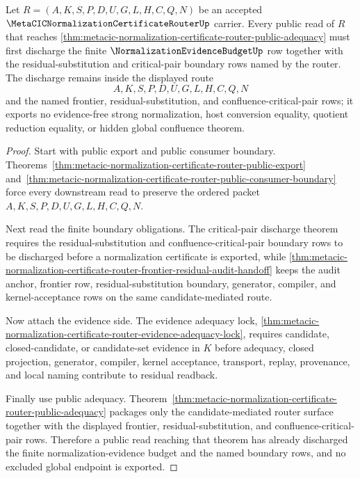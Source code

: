 \begin{theorem}
\label{thm:metacic-normalization-router-certificate-budget-discharge}
Let $R=(A,K,S,P,D,U,G,L,H,C,Q,N)$ be an accepted $\MetaCICNormalizationCertificateRouterUp$ carrier. Every public read of $R$ that reaches \autoref{thm:metacic-normalization-certificate-router-public-adequacy} must first discharge the finite $\NormalizationEvidenceBudgetUp$ row together with the residual-substitution and critical-pair boundary rows named by the router. The discharge remains inside the displayed route
$$
A,K,S,P,D,U,G,L,H,C,Q,N
$$
and the named frontier, residual-substitution, and confluence-critical-pair rows; it exports no evidence-free strong normalization, host conversion equality, quotient reduction equality, or hidden global confluence theorem.
\end{theorem}
\begin{proof}
Start with public export and public consumer boundary. Theorems~\ref{thm:metacic-normalization-certificate-router-public-export} and~\ref{thm:metacic-normalization-certificate-router-public-consumer-boundary} force every downstream read to preserve the ordered packet $A,K,S,P,D,U,G,L,H,C,Q,N$.

Next read the finite boundary obligations. The critical-pair discharge theorem requires the residual-substitution and confluence-critical-pair boundary rows to be discharged before a normalization certificate is exported, while \autoref{thm:metacic-normalization-certificate-router-frontier-residual-audit-handoff} keeps the audit anchor, frontier row, residual-substitution boundary, generator, compiler, and kernel-acceptance rows on the same candidate-mediated route.

Now attach the evidence side. The evidence adequacy lock, \autoref{thm:metacic-normalization-certificate-router-evidence-adequacy-lock}, requires candidate, closed-candidate, or candidate-set evidence in $K$ before adequacy, closed projection, generator, compiler, kernel acceptance, transport, replay, provenance, and local naming contribute to residual readback.

Finally use public adequacy. Theorem~\ref{thm:metacic-normalization-certificate-router-public-adequacy} packages only the candidate-mediated router surface together with the displayed frontier, residual-substitution, and confluence-critical-pair rows. Therefore a public read reaching that theorem has already discharged the finite normalization-evidence budget and the named boundary rows, and no excluded global endpoint is exported.
\end{proof}

